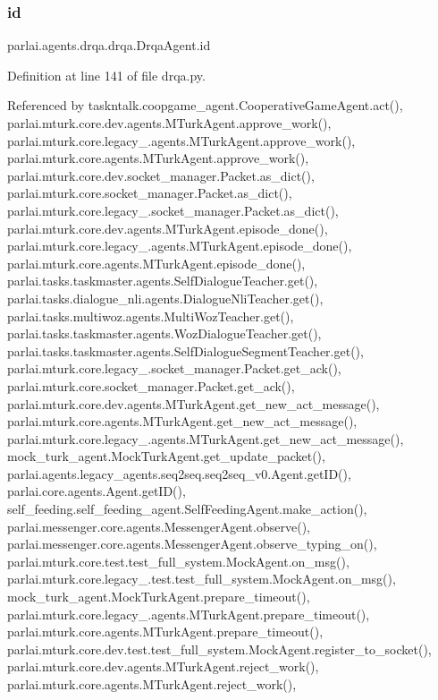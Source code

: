 \subsubsection{\texorpdfstring{id}{id}}
{\footnotesize\ttfamily parlai.\+agents.\+drqa.\+drqa.\+Drqa\+Agent.\+id}



Definition at line 141 of file drqa.\+py.



Referenced by taskntalk.\+coopgame\+\_\+agent.\+Cooperative\+Game\+Agent.\+act(), parlai.\+mturk.\+core.\+dev.\+agents.\+M\+Turk\+Agent.\+approve\+\_\+work(), parlai.\+mturk.\+core.\+legacy\+\_.\+agents.\+M\+Turk\+Agent.\+approve\+\_\+work(), parlai.\+mturk.\+core.\+agents.\+M\+Turk\+Agent.\+approve\+\_\+work(), parlai.\+mturk.\+core.\+dev.\+socket\+\_\+manager.\+Packet.\+as\+\_\+dict(), parlai.\+mturk.\+core.\+socket\+\_\+manager.\+Packet.\+as\+\_\+dict(), parlai.\+mturk.\+core.\+legacy\+\_.\+socket\+\_\+manager.\+Packet.\+as\+\_\+dict(), parlai.\+mturk.\+core.\+dev.\+agents.\+M\+Turk\+Agent.\+episode\+\_\+done(), parlai.\+mturk.\+core.\+legacy\+\_.\+agents.\+M\+Turk\+Agent.\+episode\+\_\+done(), parlai.\+mturk.\+core.\+agents.\+M\+Turk\+Agent.\+episode\+\_\+done(), parlai.\+tasks.\+taskmaster.\+agents.\+Self\+Dialogue\+Teacher.\+get(), parlai.\+tasks.\+dialogue\+\_\+nli.\+agents.\+Dialogue\+Nli\+Teacher.\+get(), parlai.\+tasks.\+multiwoz.\+agents.\+Multi\+Woz\+Teacher.\+get(), parlai.\+tasks.\+taskmaster.\+agents.\+Woz\+Dialogue\+Teacher.\+get(), parlai.\+tasks.\+taskmaster.\+agents.\+Self\+Dialogue\+Segment\+Teacher.\+get(), parlai.\+mturk.\+core.\+legacy\+\_.\+socket\+\_\+manager.\+Packet.\+get\+\_\+ack(), parlai.\+mturk.\+core.\+socket\+\_\+manager.\+Packet.\+get\+\_\+ack(), parlai.\+mturk.\+core.\+dev.\+agents.\+M\+Turk\+Agent.\+get\+\_\+new\+\_\+act\+\_\+message(), parlai.\+mturk.\+core.\+agents.\+M\+Turk\+Agent.\+get\+\_\+new\+\_\+act\+\_\+message(), parlai.\+mturk.\+core.\+legacy\+\_.\+agents.\+M\+Turk\+Agent.\+get\+\_\+new\+\_\+act\+\_\+message(), mock\+\_\+turk\+\_\+agent.\+Mock\+Turk\+Agent.\+get\+\_\+update\+\_\+packet(), parlai.\+agents.\+legacy\+\_\+agents.\+seq2seq.\+seq2seq\+\_\+v0.\+Agent.\+get\+I\+D(), parlai.\+core.\+agents.\+Agent.\+get\+I\+D(), self\+\_\+feeding.\+self\+\_\+feeding\+\_\+agent.\+Self\+Feeding\+Agent.\+make\+\_\+action(), parlai.\+messenger.\+core.\+agents.\+Messenger\+Agent.\+observe(), parlai.\+messenger.\+core.\+agents.\+Messenger\+Agent.\+observe\+\_\+typing\+\_\+on(), parlai.\+mturk.\+core.\+test.\+test\+\_\+full\+\_\+system.\+Mock\+Agent.\+on\+\_\+msg(), parlai.\+mturk.\+core.\+legacy\+\_.\+test.\+test\+\_\+full\+\_\+system.\+Mock\+Agent.\+on\+\_\+msg(), mock\+\_\+turk\+\_\+agent.\+Mock\+Turk\+Agent.\+prepare\+\_\+timeout(), parlai.\+mturk.\+core.\+legacy\+\_.\+agents.\+M\+Turk\+Agent.\+prepare\+\_\+timeout(), parlai.\+mturk.\+core.\+agents.\+M\+Turk\+Agent.\+prepare\+\_\+timeout(), parlai.\+mturk.\+core.\+dev.\+test.\+test\+\_\+full\+\_\+system.\+Mock\+Agent.\+register\+\_\+to\+\_\+socket(), parlai.\+mturk.\+core.\+dev.\+agents.\+M\+Turk\+Agent.\+reject\+\_\+work(), parlai.\+mturk.\+core.\+agents.\+M\+Turk\+Agent.\+reject\+\_\+work(), 